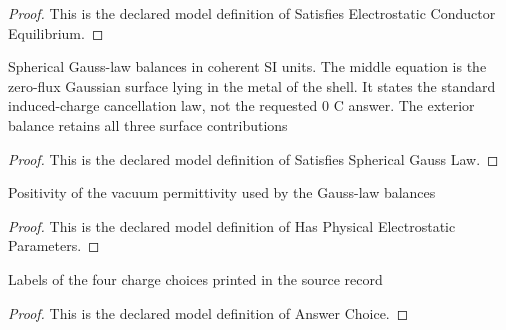 \begin{proof}
  This is the declared model definition of Satisfies Electrostatic Conductor Equilibrium.
\end{proof}
\begin{definition}
  \label{def:physics:phyx-mini-0852:phyxminiproblems-problemphyxmini0852-satisfiessphericalgausslaw}
  Spherical Gauss-law balances in coherent SI units. The middle equation is the zero-flux Gaussian surface lying in the metal of the shell. It states the standard induced-charge cancellation law, not the requested 0 C answer. The exterior balance retains all three surface contributions
\end{definition}
\begin{proof}
  This is the declared model definition of Satisfies Spherical Gauss Law.
\end{proof}
\begin{definition}
  \label{def:physics:phyx-mini-0852:phyxminiproblems-problemphyxmini0852-hasphysicalelectrostaticparameters}
  Positivity of the vacuum permittivity used by the Gauss-law balances
\end{definition}
\begin{proof}
  This is the declared model definition of Has Physical Electrostatic Parameters.
\end{proof}
\begin{definition}
  \label{def:physics:phyx-mini-0852:phyxminiproblems-problemphyxmini0852-answerchoice}
  Labels of the four charge choices printed in the source record
\end{definition}
\begin{proof}
  This is the declared model definition of Answer Choice.
\end{proof}
